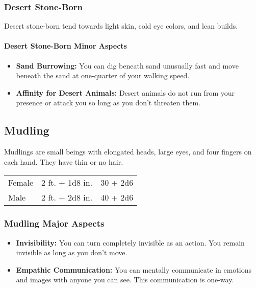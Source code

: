 \begin{multicols}{2}
\subsubsection{Desert Stone-Born}

Desert stone-born tend towards light skin, cold eye colors, and lean builds.

\paragraph{Desert Stone-Born Minor Aspects}

\begin{itemize}
    \item \textbf{Sand Burrowing:} You can dig beneath sand unusually fast and move beneath the sand at one-quarter of your walking speed.
    \item \textbf{Affinity for Desert Animals:} Desert animals do not run from your presence or attack you so long as you don't threaten them.
\end{itemize}

\subsection{Mudling}

Mudlings are small beings with elongated heads, large eyes, and four fingers on each hand. They
have thin or no hair.

\begin{center}
\begin{xtabular}{|l|l|l|}
Female & 2 ft. + 1d8 in. & 30 + 2d6 \\
Male & 2 ft. + 2d8 in. & 40 + 2d6 \\
\hline
\end{xtabular}
\end{center}

\subsubsection{Mudling Major Aspects}

\begin{itemize}
    \item \textbf{Invisibility:} You can turn completely invisible as an action. You remain invisible as long as you don't move.
    \item \textbf{Empathic Communication:} You can mentally communicate in emotions and images with anyone you can see. This communication is one-way.
\end{itemize}


\end{multicols}
